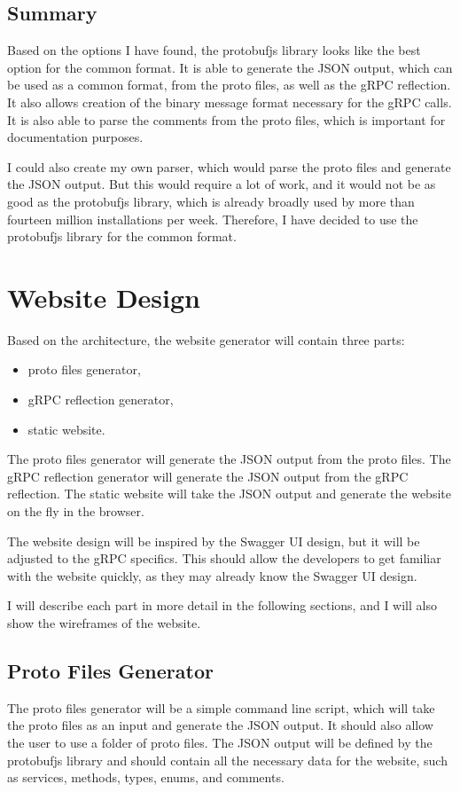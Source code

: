 \subsection{Summary}

Based on the options I have found, the protobufjs library looks like the best option for the common format.
It is able to generate the JSON output, which can be used as a common format, from the proto files, as well as the gRPC reflection.
It also allows creation of the binary message format necessary for the gRPC calls.
It is also able to parse the comments from the proto files, which is important for documentation purposes.

I could also create my own parser, which would parse the proto files and generate the JSON output.
But this would require a lot of work, and it would not be as good as the protobufjs library, which is already broadly used by more than fourteen million installations per week.
Therefore, I have decided to use the protobufjs library for the common format.


\section{Website Design}
Based on the architecture, the website generator will contain three parts:
\begin{itemize}
    \item proto files generator,
    \item gRPC reflection generator,
    \item static website.
\end{itemize}

The proto files generator will generate the JSON output from the proto files.
The gRPC reflection generator will generate the JSON output from the gRPC reflection.
The static website will take the JSON output and generate the website on the fly in the browser.

The website design will be inspired by the Swagger UI design, but it will be adjusted to the gRPC specifics.
This should allow the developers to get familiar with the website quickly, as they may already know the Swagger UI design.

I will describe each part in more detail in the following sections, and I will also show the wireframes of the website.

\subsection{Proto Files Generator}
The proto files generator will be a simple command line script, which will take the proto files as an input and generate the JSON output.
It should also allow the user to use a folder of proto files.
The JSON output will be defined by the protobufjs library and should contain all the necessary data for the website, such as services, methods, types, enums, and comments.

